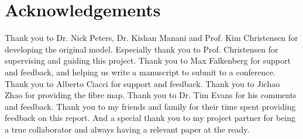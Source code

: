\clearpage
\section*{Acknowledgements}

Thank you to Dr. Nick Peters, Dr. Kishan Manani and Prof. Kim Christensen for developing the original \cmp model. Especially thank you to Prof. Christensen for supervising and guiding this project. Thank you to Max Falkenberg for support and feedback, and helping us write a manuscript to submit to a conference. Thank you to Alberto Ciacci for support and feedback. Thank you to Jichao Zhao for providing the fibre map. Thank you to Dr. Tim Evans for his comments and feedback. Thank you to my friends and family for their time spent providing feedback on this report. And a special thank you to my project partner for being a true collaborator and always having a relevant paper at the ready.


